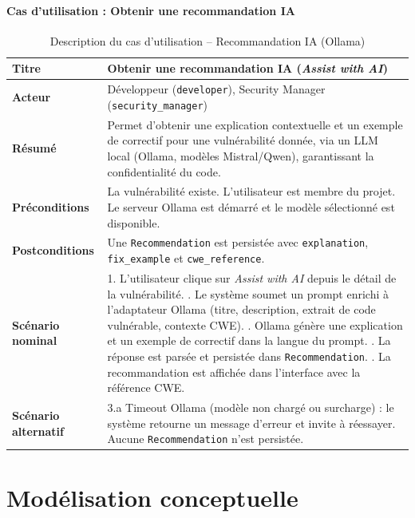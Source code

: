 \paragraph{Cas d'utilisation : Obtenir une recommandation IA}
\begin{table}[H]
\centering
\caption{Description du cas d'utilisation -- Recommandation IA (Ollama)}
\label{tab:uc-llm}
\small
\renewcommand{\arraystretch}{1.3}
\begin{tabularx}{\textwidth}{>{\bfseries}p{3.5cm} X}
\hline
Titre & Obtenir une recommandation IA (\textit{Assist with AI}) \\
\hline
Acteur & Développeur (\texttt{developer}), Security Manager (\texttt{security\_manager}) \\
\hline
Résumé & Permet d'obtenir une explication contextuelle et un exemple de correctif pour une vulnérabilité donnée, via un LLM local (Ollama, modèles Mistral/Qwen), garantissant la confidentialité du code. \\
\hline
Préconditions & La vulnérabilité existe. L'utilisateur est membre du projet. Le serveur Ollama est démarré et le modèle sélectionné est disponible. \\
\hline
Postconditions & Une \texttt{Recommendation} est persistée avec \texttt{explanation}, \texttt{fix\_example} et \texttt{cwe\_reference}. \\
\hline
Scénario nominal &
1. L'utilisateur clique sur \textit{Assist with AI} depuis le détail de la vulnérabilité. \newline
2. Le système soumet un prompt enrichi à l'adaptateur Ollama (titre, description, extrait de code vulnérable, contexte CWE). \newline
3. Ollama génère une explication et un exemple de correctif dans la langue du prompt. \newline
4. La réponse est parsée et persistée dans \texttt{Recommendation}. \newline
5. La recommandation est affichée dans l'interface avec la référence CWE. \\
\hline
Scénario alternatif &
3.a Timeout Ollama (modèle non chargé ou surcharge) : le système retourne un message d'erreur et invite à réessayer. Aucune \texttt{Recommendation} n'est persistée. \\
\hline
\end{tabularx}
\end{table}

\section{Modélisation conceptuelle}

